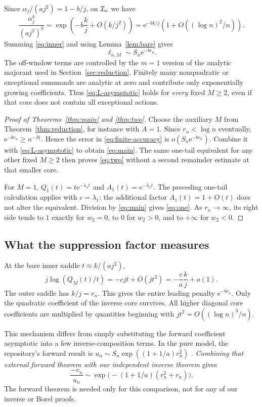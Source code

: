 \documentclass[11pt,a4paper]{article}
\numberwithin{equation}{section}
\theoremstyle{definition}
\theoremstyle{remark}\newtheorem{remark}[theorem]{Remark}
\newcommand{\ee}{\mathrm e}\newcommand{\dd}{\mathrm d}
\begin{document}
Since $\alpha_j/(aj^2)=1-b/j$, on $\mathcal I_n$ we have
\begin{equation}
 \frac{\alpha_j^k}{(aj^2)^k}
 =\exp\left(-b\frac{k}j+O(k/j^2)\right)
 =\ee^{-bk/j}\left(1+O((\log n)^2/n)\right).
 \label{eq:tilt}
\end{equation}
Summing \eqref{eq:inner} and using Lemma~\ref{lem:bare} gives
\begin{equation}
 \ell_{n,M}\sim S_n\ee^{-br_n}.
 \label{eq:L-asymptotic}
\end{equation}
The off-window terms are controlled by the $m=1$ version of the analytic
majorant used in Section~\ref{sec:reduction}. Finitely many nonquadratic
or exceptional summands are analytic at zero and contribute only
exponentially growing coefficients. Thus \eqref{eq:L-asymptotic} holds for
\emph{every} fixed $M\ge2$, even if that core does not contain all exceptional
actions.

\begin{proof}[Proof of Theorems~\ref{thm:main} and \ref{thm:two}]
Choose the auxiliary $M$ from Theorem~\ref{thm:reduction}, for instance with
$A=1$. Since $r_n<\log n$ eventually,
$\ee^{-br_n}\ge n^{-|b|}$. Hence the error in
\eqref{eq:finite-accuracy} is $o(S_n\ee^{-br_n})$.
Combine it with \eqref{eq:L-asymptotic} to obtain \eqref{eq:main}.
The same one-tail equivalent for any other fixed $M\ge2$ then proves
\eqref{eq:two} without a second remainder estimate at that smaller core.

For $M=1$, $Q_1(t)=t\ee^{-\lambda_1t}$ and
$A_1(t)=\ee^{-\lambda_1t}$. The preceding one-tail calculation applies with
$c=\lambda_1$; the additional factor $A_1(t)=1+O(t)$ does not alter the
equivalent. Division by \eqref{eq:main} gives \eqref{eq:one}.
As $r_n\to\infty$, its right side tends to $1$ exactly for $w_2=0$,
to $0$ for $w_2>0$, and to $+\infty$ for $w_2<0$.
\end{proof}

\subsection{What the suppression factor measures}
At the bare inner saddle $t\approx k/(aj^2)$,
\[
 j\log(Q_M(t)/t)=-cjt+O(jt^2)
 =-\frac ca\frac kj+o(1).
\]
The outer saddle has $k/j=r_n$. This gives the entire leading penalty
$\ee^{-br_n}$. Only the quadratic coefficient of the inverse core survives.
All higher diagonal core coefficients are multiplied by quantities beginning
with $jt^2=O((\log n)^3/n)$.

This mechanism differs from simply substituting the forward coefficient
asymptotic into a few inverse-composition terms. In the pure model, the
repository's forward result is
$u_n\sim S_n\exp((1+1/a)r_n^2)$ \cite{repo-core}.
\emph{Combining that external forward theorem with our independent inverse
theorem} gives
\begin{equation}
 \frac{-v_n}{u_n}\sim
 \exp\bigl(-(1+1/a)(r_n^2+r_n)\bigr).
 \label{eq:forward-comparison}
\end{equation}
The forward theorem is needed only for this comparison, not for any of our
inverse or Borel proofs.
\end{document}
